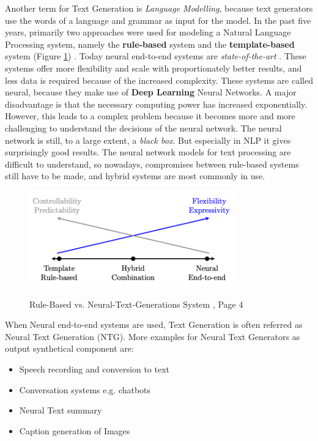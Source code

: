 Another term for Text Generation is  \textit{Language Modelling}, because text generators use the words of a language and grammar as input for the model. In the past five years, primarily two approaches were used for modeling a Natural Language Processing system, namely the \textbf{rule-based} system and the \textbf{template-based} system (Figure \ref{rules_based}) \cite{NTG2}. Today neural end-to-end systems are \textit{state-of-the-art} \cite{End_to_End}. These systems offer more flexibility and scale with proportionately better results, and less data is required because of the increased complexity. These systems are called neural, because they make use of \textbf{Deep Learning} Neural Networks.
A major disadvantage is that the necessary computing power has increased exponentially. However, this leads to a complex problem because it becomes more and more challenging to understand the decisions of the neural network. The neural network is still, to a large extent, a \textit{black box}. But especially in NLP it gives surprisingly good results. The neural network models for text processing are difficult to understand, so nowadays, compromises between rule-based systems still have to be made, and hybrid systems are most commonly in use. 


\begin{figure}
  \begin{center}
  \includegraphics[width=3.5in]{photos/rule_based}\\
  \caption{Rule-Based vs. Neural-Text-Generations System \cite{NTG2}, Page 4}\label{rules_based}
  \end{center}
\end{figure}

When Neural end-to-end systems are used, Text Generation is often referred as Neural Text Generation (NTG). More examples for Neural Text Generators as output synthetical component are:

\begin{itemize}
\item Speech recording and conversion to text
\item Conversation systems e.g. chatbots
\item Neural Text summary
\item Caption generation of Images
\end{itemize} 

